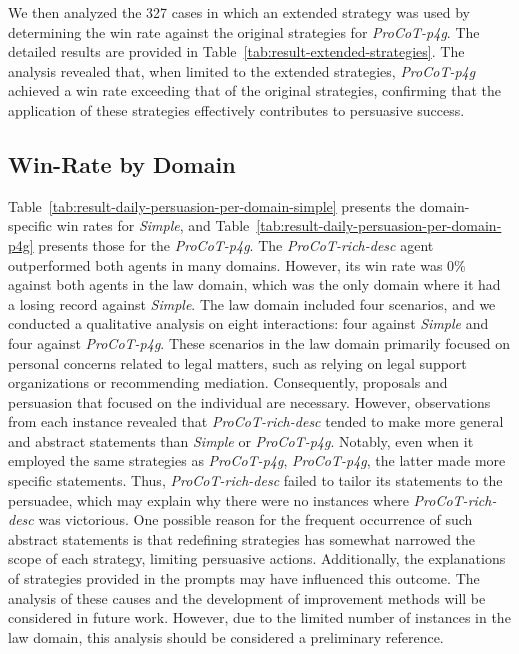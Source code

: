 \documentclass[11pt]{article}
\begin{document}
We then analyzed the 327 cases in which an extended strategy was used by determining the win rate against the original strategies for \textit{ProCoT-p4g}.
The detailed results are provided in Table~\ref{tab:result-extended-strategies}. 
The analysis revealed that, when limited to the extended strategies, \textit{ProCoT-p4g} achieved a win rate exceeding that of the original strategies, confirming that the application of these strategies effectively contributes to persuasive success.


\subsection{Win-Rate by Domain}
Table~\ref{tab:result-daily-persuasion-per-domain-simple} presents the domain-specific win rates for \textit{Simple}, and Table~\ref{tab:result-daily-persuasion-per-domain-p4g} presents those for the \textit{ProCoT-p4g}.
The \textit{ProCoT-rich-desc} agent outperformed both agents in many domains. 
However, its win rate was 0\% against both agents in the law domain, which was the only domain where it had a losing record against \textit{Simple}.
 The law domain included four scenarios, and we conducted a qualitative analysis on eight interactions: four against \textit{Simple} and four against \textit{ProCoT-p4g}.
These scenarios in the law domain primarily focused on personal concerns related to legal matters, such as relying on legal support organizations or recommending mediation. 
Consequently, proposals and persuasion that focused on the individual are necessary. 
However, observations from each instance revealed that \textit{ProCoT-rich-desc} tended to make more general and abstract statements than \textit{Simple} or \textit{ProCoT-p4g}. 
Notably, even when it employed the same strategies as \textit{ProCoT-p4g}, \textit{ProCoT-p4g}, the latter made more specific statements. 
Thus, \textit{ProCoT-rich-desc} failed to tailor its statements to the persuadee, which may explain why there were no instances where \textit{ProCoT-rich-desc} was victorious. 
One possible reason for the frequent occurrence of such abstract statements is that redefining strategies has somewhat narrowed the scope of each strategy, limiting persuasive actions. 
Additionally, the explanations of strategies provided in the prompts may have influenced this outcome. 
The analysis of these causes and the development of improvement methods will be considered in future work. 
However, due to the limited number of instances in the law domain, this analysis should be considered a preliminary reference.
\end{document}
